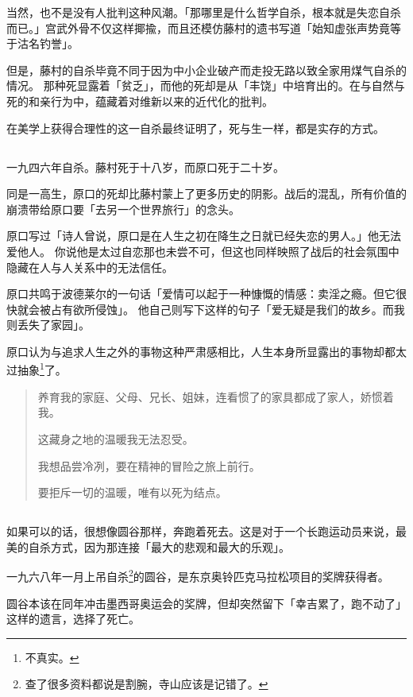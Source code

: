 \documentclass[UTF8]{ctexart}
\begin{document}
当然，也不是没有人批判这种风潮。「那哪里是什么哲学自杀，根本就是失恋自杀而已。」宫武外骨不仅这样揶揄，而且还模仿藤村的遗书写道「始知虚张声势竟等于沽名钓誉」。

但是，藤村的自杀毕竟不同于因为中小企业破产而走投无路以致全家用煤气自杀的情况。
那种死显露着「贫乏」，而他的死却是从「丰饶」中培育出的。在与自然与死的和亲行为中，蕴藏着对维新以来的近代化的批判。

在美学上获得合理性的这一自杀最终证明了，死与生一样，都是实存的方式。

\subsection{}
一九四六年自杀。藤村死于十八岁，而原口死于二十岁。

同是一高生，原口的死却比藤村蒙上了更多历史的阴影。战后的混乱，所有价值的崩溃带给原口要「去另一个世界旅行」的念头。

原口写过「诗人曾说，原口是在人生之初在降生之日就已经失恋的男人。」他无法爱他人。
你说他是太过自恋那也未尝不可，但这也同样映照了战后的社会氛围中隐藏在人与人关系中的无法信任。

原口共鸣于波德莱尔的一句话「爱情可以起于一种慷慨的情感：卖淫之瘾。但它很快就会被占有欲所侵蚀」。
他自己则写下这样的句子「爱无疑是我们的故乡。而我则丢失了家园」。

原口认为与追求人生之外的事物这种严肃感相比，人生本身所显露出的事物却都太过抽象\footnote{不真实。}了。

\begin{verse}
    养育我的家庭、父母、兄长、姐妹，连看惯了的家具都成了家人，娇惯着我。

    这藏身之地的温暖我无法忍受。

    我想品尝冷冽，要在精神的冒险之旅上前行。

    要拒斥一切的温暖，唯有以死为结点。
\end{verse}

\subsection{}

如果可以的话，很想像圆谷那样，奔跑着死去。这是对于一个长跑运动员来说，最美的自杀方式，因为那连接「最大的悲观和最大的乐观」。

一九六八年一月上吊自杀\footnote{查了很多资料都说是割腕，寺山应该是记错了。}的圆谷，是东京奥铃匹克马拉松项目的奖牌获得者。

圆谷本该在同年冲击墨西哥奥运会的奖牌，但却突然留下「幸吉累了，跑不动了」这样的遗言，选择了死亡。
\end{document}
